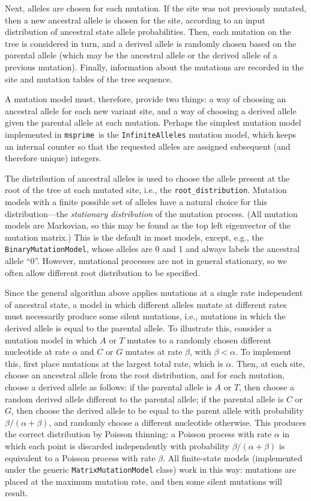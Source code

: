 \documentclass{article}
\newcommand{\msprime}[0]{\texttt{msprime}}
\begin{document}
Next, alleles are chosen for each mutation.
If the site was not previously mutated, then a new ancestral allele is chosen for the site,
according to an input distribution of ancestral state allele probabilities.
Then, each mutation on the tree is considered in turn,
and a derived allele is randomly chosen based on the parental allele
(which may be the ancestral allele or the derived allele of a previous mutation).
Finally, information about the mutations are recorded in the site and mutation tables
of the tree sequence.

A mutation model must, therefore, provide two things:
a way of choosing an ancestral allele for each new variant site,
and a way of choosing a derived allele given the parental allele at each mutation.
Perhaps the simplest mutation model implemented in \msprime\ is the
\texttt{InfiniteAlleles} mutation model,
which keeps an internal counter so that the requested alleles are
assigned subsequent (and therefore unique) integers.

The distribution of ancestral alleles
is used to choose the allele present at the root of the tree at each mutated site,
i.e., the \texttt{root\_distribution}.
Mutation models with a finite possible set of alleles have a natural choice
for this distribution---the \emph{stationary distribution} of the mutation process.
(All mutation models are Markovian,
so this may be found as the top left eigenvector of the mutation matrix.)
This is the default in most models,
except, e.g., the \texttt{BinaryMutationModel}, whose alleles are 0 and 1
and always labels the ancestral allele ``0''.
However, mutational processes are not in general stationary,
so we often allow different root distribution to be specified.

Since the general algorithm above applies mutations at a single rate
independent of ancestral state,
a model in which different alleles mutate at different rates
must necessarily produce some silent mutations,
i.e., mutations in which the derived allele is equal to the parental allele.
To illustrate this, consider a mutation model
in which $A$ or $T$ mutates to a randomly chosen different nucleotide at rate $\alpha$
and $C$ or $G$ mutates at rate $\beta$, with $\beta < \alpha$.
To implement this, first place mutations at the largest total rate, which is $\alpha$.
Then, at each site, choose an ancestral allele from the root distribution,
and for each mutation, choose a derived allele as follows:
if the parental allele is $A$ or $T$, then choose a random derived allele
different to the parental allele;
if the parental allele is $C$ or $G$,
then choose the derived allele to be equal to the parent allele
with probability $\beta/(\alpha + \beta)$,
and randomly choose a different nucleotide otherwise.
This produces the correct distribution by Poisson thinning:
a Poisson process with rate $\alpha$ in which each point is discarded independently
with probability $\beta / (\alpha + \beta)$ is equivalent to a Poisson
process with rate $\beta$.
All finite-state models (implemented under the generic \texttt{MatrixMutationModel} class)
work in this way: mutations are placed at the maximum mutation rate,
and then some silent mutations will result.
\end{document}
